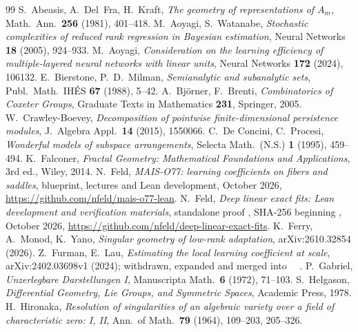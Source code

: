\documentclass[11pt,a4paper]{article}
\theoremstyle{definition}
\theoremstyle{remark}
\numberwithin{equation}{section}
\providecommand{\DIFaddtex}[1]{{\protect\color{blue}#1}} %
\providecommand{\DIFaddbegin}{} %
\providecommand{\DIFaddend}{} %
\providecommand{\DIFadd}[1]{\texorpdfstring{\DIFaddtex{#1}}{#1}} %
\begin{document}
\begin{thebibliography}{99}
 S.~Abeasis, A.~Del~Fra, H.~Kraft, \emph{The geometry of representations of $A_m$}, Math.\ Ann.\ \textbf{256} (1981), 401--418.
 M.~Aoyagi, S.~Watanabe, \emph{Stochastic complexities of reduced rank regression in Bayesian estimation}, Neural Networks \textbf{18} (2005), 924--933.
 M.~Aoyagi, \emph{Consideration on the learning efficiency of multiple-layered neural networks with linear units}, Neural Networks \textbf{172} (2024), 106132.
 E.~Bierstone, P.~D.~Milman, \emph{Semianalytic and subanalytic sets}, Publ.\ Math.\ IHÉS \textbf{67} (1988), 5--42.
 A.~Björner, F.~Brenti, \emph{Combinatorics of Coxeter Groups}, Graduate Texts in Mathematics \textbf{231}, Springer, 2005.
 W.~Crawley-Boevey, \emph{Decomposition of pointwise finite-dimensional persistence modules}, J.\ Algebra Appl.\ \textbf{14} (2015), 1550066.
 C.~De Concini, C.~Procesi, \emph{Wonderful models of subspace arrangements}, Selecta Math.\ (N.S.) \textbf{1} (1995), 459--494.
 K.~Falconer, \emph{Fractal Geometry: Mathematical Foundations and Applications}, 3rd ed., Wiley, 2014.
 N.~Feld, \emph{MAIS-O77: learning coefficients on fibers and saddles}, blueprint, lectures and Lean development, October 2026, \url{https://github.com/nfeld/mais-o77-lean}.
 N.~Feld, \emph{Deep linear exact fits: Lean development and verification materials}, standalone proof , SHA-256 beginning , October 2026, \url{https://github.com/nfeld/deep-linear-exact-fits}.
 K.~Ferry, A.~Monod, K.~Yano, \emph{Singular geometry of low-rank adaptation}, arXiv:2610.32854 (2026).
 Z.~Furman, E.~Lau, \emph{Estimating the local learning coefficient at scale}, arXiv:2402.03698\DIFaddbegin \DIFadd{v1 }\DIFaddend (2024)\DIFaddbegin \DIFadd{; withdrawn, expanded and merged into~\mbox{%
\cite{lau-llc}}\hskip0pt%
}\DIFaddend .
 P.~Gabriel, \emph{Unzerlegbare Darstellungen I}, Manuscripta Math.\ \textbf{6} (1972), 71--103.
 S.~Helgason, \emph{Differential Geometry, Lie Groups, and Symmetric Spaces}, Academic Press, 1978.
 H.~Hironaka, \emph{Resolution of singularities of an algebraic variety over a field of characteristic zero: I, II}, Ann.\ of Math.\ \textbf{79} (1964), 109--203, 205--326.

\end{thebibliography}
\end{document}
